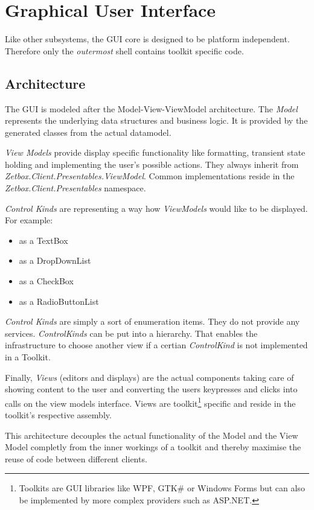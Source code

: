 \section{Graphical User Interface}

Like other subsystems, the GUI core is designed to be platform
independent. Therefore only the \emph{outermost} shell contains toolkit
specific code.

\subsection{Architecture}

The GUI is modeled after the Model-View-ViewModel architecture. The
\emph{Model} represents the underlying data structures and business
logic. It is provided by the generated classes from the actual
datamodel. 

\emph{View Models} provide
display specific functionality like formatting, transient state holding
and implementing the user's possible actions. They always inherit from
\emph{Zetbox.Client.Presentables.ViewModel}.
Common implementations reside in the
\emph{Zetbox.Client.Presentables} namespace.

\emph{Control Kinds} are representing a way how \emph{ViewModels} would like to be displayed. For example:

\begin{itemize}
\item as a TextBox
\item as a DropDownList
\item as a CheckBox
\item as a RadioButtonList
\end{itemize}

\emph{Control Kinds} are simply a sort of enumeration items. They do not provide any services. 
\emph{ControlKinds} can be put into a hierarchy. That enables the infrastructure to choose another view if a certian 
\emph{ControlKind} is not implemented in a Toolkit.
 
Finally,
\emph{Views} (editors and displays) are the actual components taking
care of showing content to the user and converting the users keypresses
and clicks into calls on the view models interface.  Views are
toolkit\footnote{Toolkits are GUI libraries like WPF, GTK\# or Windows
Forms but can also be implemented by more complex providers such as
ASP.NET.} specific and reside in the toolkit's respective assembly.

This architecture decouples the actual functionality of the Model and
the View Model completly from the inner workings of a toolkit and
thereby maximise the reuse of code between different clients.

